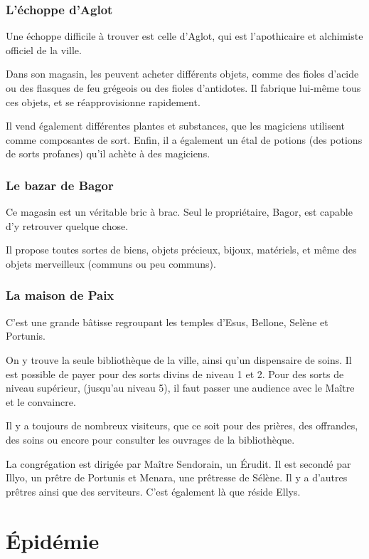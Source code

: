 \documentclass[a4paper,10pt,openany]{book}
\begin{document}
\begin{multicols}{2}
\subsection{L’échoppe d’Aglot}
Une échoppe difficile à trouver est celle d’Aglot, qui est l’apothicaire et alchimiste officiel de la ville.\par Dans son magasin, les \PJs peuvent
acheter différents objets, comme des fioles d’acide ou des flasques de feu grégeois ou des fioles d’antidotes. Il fabrique lui-même tous ces objets,
et se réapprovisionne rapidement.\par Il vend également différentes plantes et substances, que les magiciens utilisent comme composantes de sort.
Enfin, il a également un étal de potions (des potions de sorts profanes) qu’il achète à des magiciens.
\subsection{Le bazar de Bagor}
Ce magasin est un véritable bric à brac. Seul le propriétaire, Bagor, est capable d’y retrouver quelque chose.\par  Il propose toutes sortes de biens,
objets précieux, bijoux, matériels, et même des objets merveilleux (communs ou peu communs).
\subsection{La maison de Paix}
C’est une grande bâtisse regroupant les temples d’Esus, Bellone, Selène et Portunis.\par On y trouve la seule bibliothèque de la ville, ainsi qu’un
dispensaire de soins. Il est possible de payer pour des sorts divins de niveau 1 et 2. Pour des sorts de niveau supérieur, (jusqu’au niveau 5), il
faut passer une audience avec le Maître et le convaincre.\par  Il y a toujours de nombreux visiteurs, que ce soit pour des prières, des offrandes, des
soins ou encore pour consulter les ouvrages de la bibliothèque.\par La congrégation est dirigée par Maître Sendorain, un Érudit. Il est secondé par
Illyo, un prêtre de Portunis et Menara, une prêtresse de Sélène. Il y a d’autres prêtres ainsi que des serviteurs. C’est également là que réside
Ellys.

\end{multicols}

\chapter{Épidémie}
\end{document}
